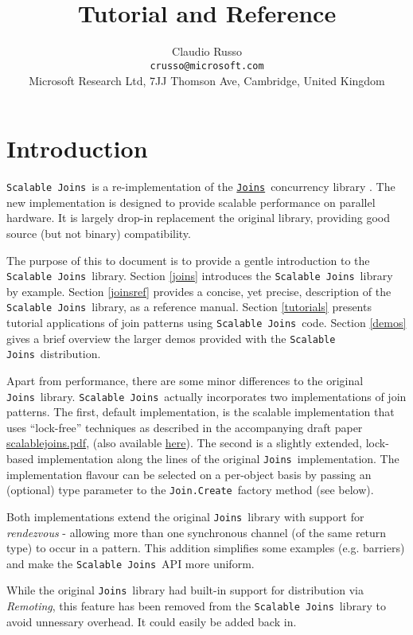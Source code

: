 \documentclass{article}
\title{\sjoins\ \\
       Tutorial and Reference}
\author{Claudio Russo
\\{\makeatother \texttt{crusso@microsoft.com}}
\\    Microsoft Research Ltd, 7JJ Thomson Ave, Cambridge, United Kingdom}
\newcommand{\sjoins}{{\texttt{Scalable Joins}}}
\newcommand{\joins}{{\texttt{Joins}}}
\newcommand{\joindotcreate}{\texttt{Join.Create}}
\begin{document}
\maketitle

\section{Introduction}

\sjoins\ is a re-implementation of the \href{http://research.microsoft.com/~crusso/joins/}{\joins}\ concurrency  library \cite{russo07JoinsLibrary}.
The new implementation is designed to provide scalable performance on parallel hardware.
It is largely drop-in replacement the original library, providing good source (but not binary) compatibility. 

The purpose of this to document is to provide a gentle introduction to the \sjoins\ library. 
Section \ref{joins} introduces the \sjoins\ library by example.
Section \ref{joinsref} provides a concise, yet precise, description of the \sjoins\ library, as a reference manual.
Section \ref{tutorials} presents tutorial applications of join patterns using \sjoins\ code.
Section \ref{demos} gives a brief overview the larger demos provided with the \sjoins\ distribution.

Apart from performance, there are some minor differences to the original \joins\ library.
\sjoins\ actually incorporates two implementations of join patterns. The first, default implementation, is the
scalable implementation that uses ``lock-free'' techniques as described in the accompanying draft paper \url{scalablejoins.pdf},
(also available \href{http://research.microsoft.com/crusso/papers/scalablejoins.pdf}{here}).
The second is a slightly extended, lock-based implementation along the lines of the original \joins\ implementation.
The implementation flavour can be selected on a per-object basis by passing an (optional) type parameter to the \joindotcreate\ factory method (see below).

Both implementations extend the original \joins\ library with support for \emph{rendezvous} - allowing more than one synchronous channel (of the same return type) to occur in a pattern.
This addition simplifies some examples (e.g. barriers) and make the \sjoins\ API more uniform.

While the original \joins\ library had built-in support for distribution via \emph{Remoting}, this feature has been
removed from the \sjoins\ library to avoid unnessary overhead. It could easily be added back in.
\end{document}
